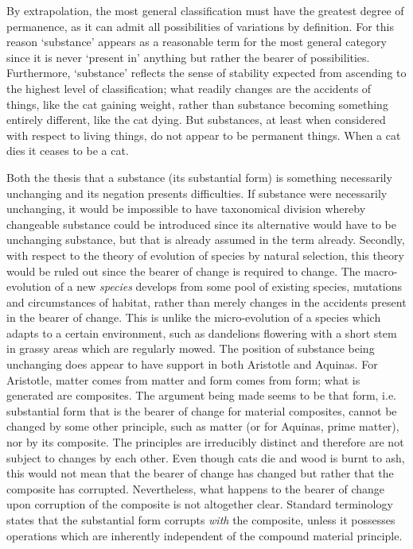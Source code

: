 By extrapolation, the most general classification must have the greatest degree of permanence, as it can admit all possibilities of variations by definition. For this reason `substance' appears as a reasonable term for the most general category since it is never `present in' anything but rather the bearer of possibilities. Furthermore, `substance' reflects the sense of stability expected from ascending to the highest level of classification; what readily changes are the accidents of things, like the cat gaining weight, rather than substance becoming something entirely different, like the cat dying. But substances, at least when considered with respect to living things, do not appear to be permanent things. When a cat dies it ceases to be a cat.

Both the thesis that a substance (its substantial form) is something necessarily unchanging and its negation presents difficulties.
If substance were necessarily unchanging, it would be impossible to have taxonomical division whereby changeable substance could be introduced since its alternative would have to be unchanging substance, but that is already assumed in the term already.
Secondly, with respect to the theory of evolution of species by natural selection, this theory would be ruled out since the bearer of change is required to change. The macro-evolution of a new \emph{species} develops from some pool of existing species, mutations and circumstances of habitat, rather than merely changes in the accidents present in the bearer of change. This is unlike the micro-evolution of a species which adapts to a certain environment, such as dandelions flowering with a short stem in grassy areas which are regularly mowed.
The position of substance being unchanging does appear to have support in both Aristotle and Aquinas. For Aristotle, matter comes from matter and form comes from form; what is generated are composites. The argument being made seems to be that form, i.e. substantial form that is the bearer of change for material composites,  cannot be changed by some other principle, such as matter (or for Aquinas, prime matter), nor by its composite. The principles are irreducibly distinct and therefore are not subject to changes by each other. Even though cats die and wood is burnt to ash, this would not mean that the bearer of change has changed but rather that the composite has corrupted. Nevertheless, what happens to the bearer of change upon corruption of the composite is not altogether clear. Standard terminology states that the substantial form corrupts \emph{with} the composite, unless it possesses operations which are inherently independent of the compound material principle.

